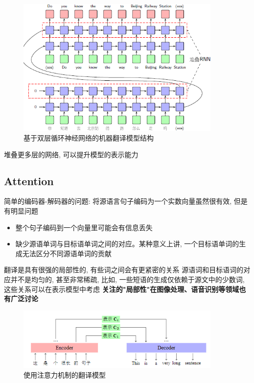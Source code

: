 \documentclass[a4paper]{article}
\begin{document}
\begin{figure}[htp]
    \centering
    \includegraphics[width=0.9\textwidth]{multiNet_NML.png}
    \caption{基于双层循环神经网络的机器翻译模型结构}
    \end{figure}
 堆叠更多层的网络, 可以提升模型的表示能力
 
\subsection{Attention}

简单的编码器-解码器的问题:
将源语言句子编码为一个实数向量虽然很有效, 但是有明显问题
\begin{itemize}
    \item 
    整个句子编码到一个向量里可能会有信息丢失
    \item 
    缺少源语单词与目标语单词之间的对应。某种意义上讲, 一个目标语单词的生成无法区分不同源语单词的贡献
\end{itemize}
翻译是具有很强的局部性的, 有些词之间会有更紧密的关系
源语词和目标语词的对应并不是均匀的, 甚至非常稀疏, 比如, 一些短语的生成仅依赖于源文中的少数词, 这些关系可以在表示模型中考虑
\textbf{关注的"局部性"在图像处理、语音识别等领域也有广泛讨论}
\begin{figure}[htp]
    \centering
    \includegraphics[width=0.9\textwidth]{attention1.png}
    \caption{使用注意力机制的翻译模型}
    \end{figure}
\end{document}
